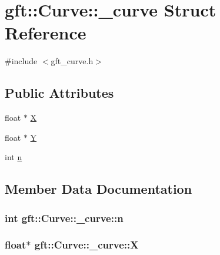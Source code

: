 \hypertarget{structgft_1_1Curve_1_1__curve}{}\section{gft\+:\+:Curve\+:\+:\+\_\+curve Struct Reference}
\label{structgft_1_1Curve_1_1__curve}


{\ttfamily \#include $<$gft\+\_\+curve.\+h$>$}

\subsection*{Public Attributes}
\begin{DoxyCompactItemize}
\item 
float $\ast$ \hyperlink{structgft_1_1Curve_1_1__curve_a2e66f87762fc4f9f34b92ae2bb832c06}{X}
\item 
float $\ast$ \hyperlink{structgft_1_1Curve_1_1__curve_a41af9aa85ad177abd58f933208fc90b7}{Y}
\item 
int \hyperlink{structgft_1_1Curve_1_1__curve_a8720eb6b07fed54175eac0a2776fa1d3}{n}
\end{DoxyCompactItemize}


\subsection{Member Data Documentation}
\subsubsection[{\texorpdfstring{n}{n}}]{\setlength{\rightskip}{0pt plus 5cm}int gft\+::\+Curve\+::\+\_\+curve\+::n}\hypertarget{structgft_1_1Curve_1_1__curve_a8720eb6b07fed54175eac0a2776fa1d3}{}\label{structgft_1_1Curve_1_1__curve_a8720eb6b07fed54175eac0a2776fa1d3}
\subsubsection[{\texorpdfstring{X}{X}}]{\setlength{\rightskip}{0pt plus 5cm}float$\ast$ gft\+::\+Curve\+::\+\_\+curve\+::X}\hypertarget{structgft_1_1Curve_1_1__curve_a2e66f87762fc4f9f34b92ae2bb832c06}{}\label{structgft_1_1Curve_1_1__curve_a2e66f87762fc4f9f34b92ae2bb832c06}
